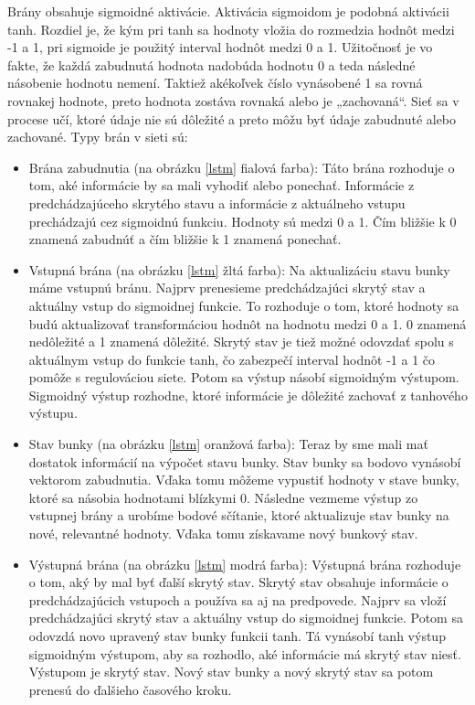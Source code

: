 Brány obsahuje sigmoidné aktivácie. Aktivácia sigmoidom je podobná aktivácii tanh. Rozdiel je, že kým pri tanh sa hodnoty vložia do rozmedzia hodnôt medzi -1 a 1, pri sigmoide je použitý interval hodnôt medzi 0 a 1. Užitočnosť je vo fakte, že každá zabudnutá hodnota nadobúda hodnotu 0 a teda následné násobenie hodnotu nemení. Taktiež akékoľvek číslo vynásobené 1 sa rovná rovnakej hodnote, preto hodnota zostáva rovnaká alebo je „zachovaná“. Sieť sa v procese učí, ktoré údaje nie sú dôležité a preto môžu byť údaje zabudnuté alebo zachované. Typy brán v sieti sú:
\begin{itemize}
    \item Brána zabudnutia (na obrázku \ref{lstm} fialová farba): Táto brána rozhoduje o tom, aké informácie by sa mali vyhodiť alebo ponechať. Informácie z predchádzajúceho skrytého stavu a informácie z aktuálneho vstupu prechádzajú cez sigmoidnú funkciu. Hodnoty sú medzi 0 a 1. Čím bližšie k 0 znamená zabudnúť a čím bližšie k 1 znamená ponechať.
    \item Vstupná brána (na obrázku \ref{lstm} žltá farba): Na aktualizáciu stavu bunky máme vstupnú bránu. Najprv prenesieme predchádzajúci skrytý stav a aktuálny vstup do sigmoidnej funkcie. To rozhoduje o tom, ktoré hodnoty sa budú aktualizovať transformáciou hodnôt na hodnotu medzi 0 a 1. 0 znamená nedôležité a 1 znamená dôležité. Skrytý stav je tiež možné odovzdať spolu s aktuálnym vstup do funkcie tanh, čo zabezpečí interval hodnôt -1 a 1 čo pomôže s regulováciou siete. Potom sa výstup násobí sigmoidným výstupom. Sigmoidný výstup rozhodne, ktoré informácie je dôležité zachovať z tanhového výstupu.
    \item Stav bunky (na obrázku \ref{lstm} oranžová farba): Teraz by sme mali mať dostatok informácií na výpočet stavu bunky. Stav bunky sa bodovo vynásobí vektorom zabudnutia. Vďaka tomu môžeme vypustiť hodnoty v stave bunky, ktoré sa násobia hodnotami blízkymi 0. Následne vezmeme výstup zo vstupnej brány a urobíme bodové sčítanie, ktoré aktualizuje stav bunky na nové, relevantné hodnoty. Vďaka tomu získavame nový bunkový stav.
    \item Výstupná brána (na obrázku \ref{lstm} modrá farba): Výstupná brána rozhoduje o tom, aký by mal byť ďalší skrytý stav. Skrytý stav obsahuje informácie o predchádzajúcich vstupoch a používa sa aj na predpovede. Najprv sa vloží predchádzajúci skrytý stav a aktuálny vstup do sigmoidnej funkcie. Potom sa odovzdá novo upravený stav bunky funkcii tanh. Tá vynásobí tanh výstup sigmoidným výstupom, aby sa rozhodlo, aké informácie má skrytý stav niesť. Výstupom je skrytý stav. Nový stav bunky a nový skrytý stav sa potom prenesú do ďalšieho časového kroku.
\end{itemize}


